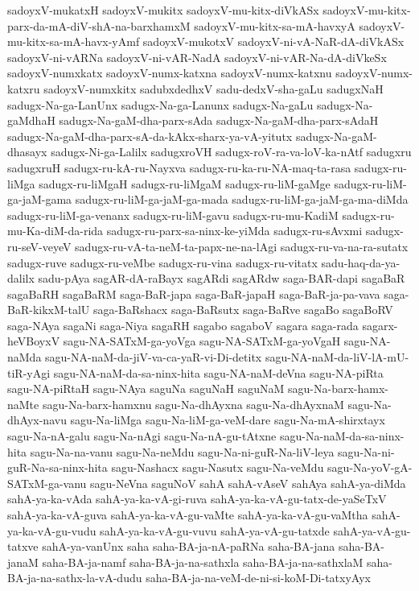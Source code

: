 {sadoyxV-mukatxH
sadoyxV-mukitx
sadoyxV-mu-kitx-diVkASx
sadoyxV-mu-kitx-parx-da-mA-diV-shA-na-barxhamxM
sadoyxV-mu-kitx-sa-mA-havxyA
sadoyxV-mu-kitx-sa-mA-havx-yAmf
sadoyxV-mukotxV
sadoyxV-ni-vA-NaR-dA-diVkASx
sadoyxV-ni-vARNa
sadoyxV-ni-vAR-NadA
sadoyxV-ni-vAR-Na-dA-diVkeSx
sadoyxV-numxkatx
sadoyxV-numx-katxna
sadoyxV-numx-katxnu
sadoyxV-numx-katxru
sadoyxV-numxkitx
sadubxdedhxV
sadu-dedxV-sha-gaLu
sadugxNaH
sadugx-Na-ga-LanUnx
sadugx-Na-ga-Lanunx
sadugx-Na-gaLu
sadugx-Na-gaMdhaH
sadugx-Na-gaM-dha-parx-sAda
sadugx-Na-gaM-dha-parx-sAdaH
sadugx-Na-gaM-dha-parx-sA-da-kAkx-sharx-ya-vA-yitutx
sadugx-Na-gaM-dhasayx
sadugx-Ni-ga-Lalilx
sadugxroVH
sadugx-roV-ra-va-loV-ka-nAtf
sadugxru
sadugxruH
sadugx-ru-kA-ru-Nayxva
sadugx-ru-ka-ru-NA-maq-ta-rasa
sadugx-ru-liMga
sadugx-ru-liMgaH
sadugx-ru-liMgaM
sadugx-ru-liM-gaMge
sadugx-ru-liM-ga-jaM-gama
sadugx-ru-liM-ga-jaM-ga-mada
sadugx-ru-liM-ga-jaM-ga-ma-diMda
sadugx-ru-liM-ga-venanx
sadugx-ru-liM-gavu
sadugx-ru-mu-KadiM
sadugx-ru-mu-Ka-diM-da-rida
sadugx-ru-parx-sa-ninx-ke-yiMda
sadugx-ru-sAvxmi
sadugx-ru-seV-veyeV
sadugx-ru-vA-ta-neM-ta-papx-ne-na-lAgi
sadugx-ru-va-na-ra-sutatx
sadugx-ruve
sadugx-ru-veMbe
sadugx-ru-vina
sadugx-ru-vitatx
sadu-haq-da-ya-dalilx
sadu-pAya
sagAR-dA-raBayx
sagARdi
sagARdw
saga-BAR-dapi
sagaBaR
sagaBaRH
sagaBaRM
saga-BaR-japa
saga-BaR-japaH
saga-BaR-ja-pa-vava
saga-BaR-kikxM-talU
saga-BaRshacx
saga-BaRsutx
saga-BaRve
sagaBo
sagaBoRV
saga-NAya
sagaNi
saga-Niya
sagaRH
sagabo
sagaboV
sagara
saga-rada
sagarx-heVBoyxV
sagu-NA-SATxM-ga-yoVga
sagu-NA-SATxM-ga-yoVgaH
sagu-NA-naMda
sagu-NA-naM-da-jiV-va-ca-yaR-vi-Di-detitx
sagu-NA-naM-da-liV-lA-mU-tiR-yAgi
sagu-NA-naM-da-sa-ninx-hita
sagu-NA-naM-deVna
sagu-NA-piRta
sagu-NA-piRtaH
sagu-NAya
saguNa
saguNaH
saguNaM
sagu-Na-barx-hamx-naMte
sagu-Na-barx-hamxnu
sagu-Na-dhAyxna
sagu-Na-dhAyxnaM
sagu-Na-dhAyx-navu
sagu-Na-liMga
sagu-Na-liM-ga-veM-dare
sagu-Na-mA-shirxtayx
sagu-Na-nA-galu
sagu-Na-nAgi
sagu-Na-nA-gu-tAtxne
sagu-Na-naM-da-sa-ninx-hita
sagu-Na-na-vanu
sagu-Na-neMdu
sagu-Na-ni-guR-Na-liV-leya
sagu-Na-ni-guR-Na-sa-ninx-hita
sagu-Nashacx
sagu-Nasutx
sagu-Na-veMdu
sagu-Na-yoV-gA-SATxM-ga-vanu
sagu-NeVna
saguNoV
sahA
sahA-vAseV
sahAya
sahA-ya-diMda
sahA-ya-ka-vAda
sahA-ya-ka-vA-gi-ruva
sahA-ya-ka-vA-gu-tatx-de-yaSeTxV
sahA-ya-ka-vA-guva
sahA-ya-ka-vA-gu-vaMte
sahA-ya-ka-vA-gu-vaMtha
sahA-ya-ka-vA-gu-vudu
sahA-ya-ka-vA-gu-vuvu
sahA-ya-vA-gu-tatxde
sahA-ya-vA-gu-tatxve
sahA-ya-vanUnx
saha
saha-BA-ja-nA-paRNa
saha-BA-jana
saha-BA-janaM
saha-BA-ja-namf
saha-BA-ja-na-sathxla
saha-BA-ja-na-sathxlaM
saha-BA-ja-na-sathx-la-vA-dudu
saha-BA-ja-na-veM-de-ni-si-koM-Di-tatxyAyx
}
